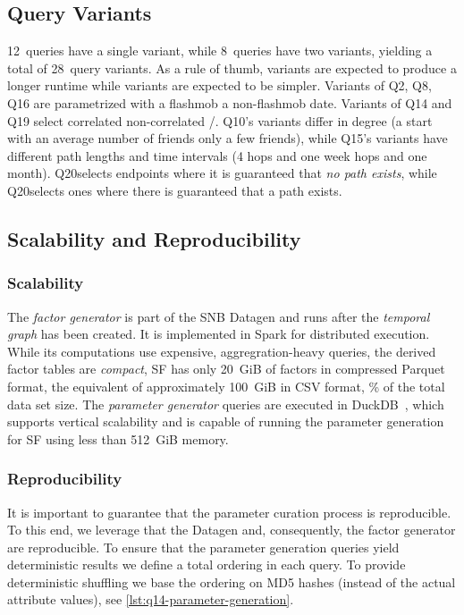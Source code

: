 \subsection{Query Variants}
\label{sec:bi-query-variants}

12~queries have a single variant, while 8~queries have two variants, yielding a total of 28~query variants.
As a rule of thumb, variants \variantA are expected to produce a longer runtime
while variants \variantB are expected to be simpler.
Variants of Q2, Q8, Q16 are parametrized with a flashmob \vs a non-flashmob date.
Variants of Q14 and Q19 select correlated \vs non-correlated \tCountries/\tCities.
Q10's variants differ in degree (a start \tPerson with an average number of friends \vs only a few friends), while
Q15's variants have different path lengths and time intervals (4 hops and one week  hops and one month).
Q20\variantA selects endpoints where it is guaranteed that \emph{no path exists}, while Q20\variantB selects ones where there is guaranteed that a path exists.

\subsection{Scalability and Reproducibility}
\label{sec:paramgen-scalability}


\subsubsection{Scalability}
The \emph{factor generator} is part of the SNB Datagen and runs after the \textit{temporal graph} has been created.
It is implemented in Spark for distributed execution.
While its computations use expensive, aggregration-heavy queries, the derived factor tables are \emph{compact}, \eg SF has only 20~GiB of factors in compressed Parquet format, the equivalent of approximately 100~GiB in CSV format, \% of the total data set size.
The \emph{parameter generator} queries are executed in DuckDB~\cite{DBLP:conf/sigmod/RaasveldtM19},
which supports vertical scalability and is capable of running the parameter generation for SF using less than 512~GiB memory.



\subsubsection{Reproducibility}
It is important to guarantee that the parameter curation process is reproducible.
To this end, we leverage that the Datagen and, consequently, the factor generator are reproducible.
To ensure that the parameter generation queries yield deterministic results we define a total ordering in each query.
To provide deterministic shuffling we base the ordering on MD5 hashes (instead of the actual attribute values), see \autoref{lst:q14-parameter-generation}.

